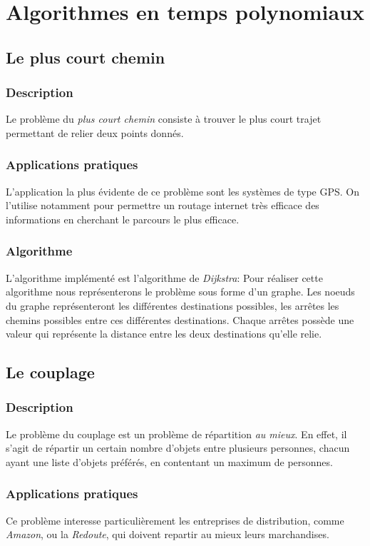 \section{Algorithmes en temps polynomiaux}
    \subsection{Le plus court chemin}
        \subsubsection{Description}
        Le problème du \emph{plus court chemin} consiste à trouver
        le plus court trajet permettant de relier deux points donnés.
        \subsubsection{Applications pratiques}
            L'application la plus évidente de ce problème sont les systèmes de type
            GPS. On l'utilise notamment pour permettre un routage internet très efficace 
            des informations en cherchant le parcours le plus efficace.
        \subsubsection{Algorithme}
	L'algorithme implémenté est l'algorithme de \emph{Dijkstra}: 
	Pour réaliser cette algorithme nous représenterons le problème sous 
	forme d'un graphe. Les noeuds du graphe représenteront les différentes destinations possibles, 
	les arrêtes les chemins possibles entre ces différentes destinations. Chaque arrêtes possède 
	une valeur qui représente la distance entre les deux destinations qu'elle relie.
			
    \subsection{Le couplage}
        \subsubsection{Description}
            Le problème du couplage est un problème de répartition \emph{au mieux}.
            En effet, il s'agit de répartir un certain nombre d'objets
            entre plusieurs personnes, chacun ayant une liste d'objets
            préférés, en contentant un maximum de personnes.
        \subsubsection{Applications pratiques}
            Ce problème interesse particulièrement les entreprises
            de distribution, comme \emph{Amazon},
            ou la \emph{Redoute}, qui doivent
            repartir au mieux leurs marchandises.
